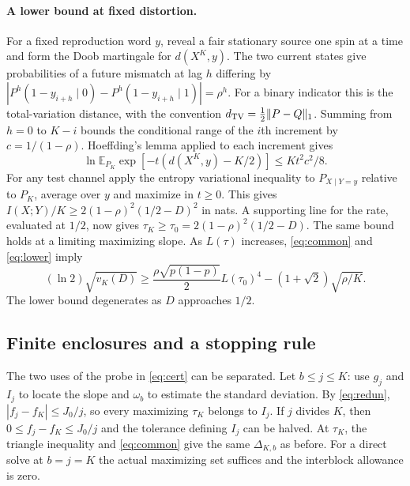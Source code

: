 \documentclass[11pt,letterpaper]{article}
\theoremstyle{definition}
\newcommand{\E}{\mathbb E}
\begin{document}
\paragraph{A lower bound at fixed distortion.}
For a fixed reproduction word $y$, reveal a fair stationary source one spin at a time and form the Doob martingale for $d(X^K,y)$. The two current states give probabilities of a future mismatch at lag $h$ differing by $|P^h(1-y_{i+h}\mid0)-P^h(1-y_{i+h}\mid1)|=\rho^h$. For a binary indicator this is the total-variation distance, with the convention $d_{\rm TV}=\tfrac12\|P-Q\|_1$. Summing from $h=0$ to $K-i$ bounds the conditional range of the $i$th increment by $c=1/(1-\rho)$. Hoeffding's lemma applied to each increment gives
\[
 \ln\E_{P_K}\exp[-t(d(X^K,y)-K/2)]\le Kt^2c^2/8 .
\]
For any test channel apply the entropy variational inequality to $P_{X\mid Y=y}$ relative to $P_K$, average over $y$ and maximize in $t\ge0$. This gives $I(X;Y)/K\ge2(1-\rho)^2(1/2-D)^2$ in nats. A supporting line for the rate, evaluated at $1/2$, now gives $\tau_K\ge \tau_0=2(1-\rho)^2(1/2-D)$. The same bound holds at a limiting maximizing slope. As $L(\tau)$ increases, \eqref{eq:common} and \eqref{eq:lower} imply
\[
 (\ln2)\sqrt{v_K(D)}
 \ge\frac{\rho\sqrt{p(1-p)}}2 L(\tau_0)^4
       -(1+\sqrt2)\sqrt{\rho/K}.
\]
The lower bound degenerates as $D$ approaches $1/2$.

\subsection{Finite enclosures and a stopping rule}\label{app:certificate}
The two uses of the probe in \eqref{eq:cert} can be separated. Let $b\le j\le K$: use $g_j$ and $I_j$ to locate the slope and $\omega_b$ to estimate the standard deviation. By \eqref{eq:redun}, $|f_j-f_K|\le J_0/j$, so every maximizing $\tau_K$ belongs to $I_j$. If $j$ divides $K$, then $0\le f_j-f_K\le J_0/j$ and the tolerance defining $I_j$ can be halved. At $\tau_K$, the triangle inequality and \eqref{eq:common} give the same $\Delta_{K,b}$ as before. For a direct solve at $b=j=K$ the actual maximizing set suffices and the interblock allowance is zero.
\end{document}
